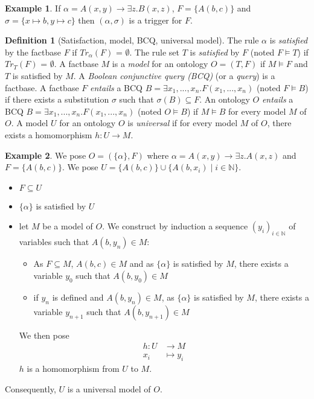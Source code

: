 \documentclass{article}
\theoremstyle{definition}
\newtheorem{definition}{Definition}[section]
\newtheorem{example}{Example}[section]
\theoremstyle{remark}
\def \N {\mathbb N}
\begin{document}
\begin{example}If $\alpha = A(x,y) \rightarrow \exists z.B(x,z)$, $F = \{A(b,c)\}$ and $\sigma = \{x \mapsto b, y \mapsto c \}$ then $(\alpha,\sigma)$ is a trigger for $F$.
\end{example}

\begin{definition}[Satisfaction, model, BCQ, universal model]
The rule $\alpha$ is \emph{satisfied} by the factbase $F$ if $\textit{Tr}_{\alpha}(F)$ = $\emptyset$. The rule set $T$ is \emph{satisfied} by $F$ (noted $F \models T$) if $\textit{Tr}_{T}(F)$ = $\emptyset$. A factbase $M$ is a \emph{model} for an ontology $O = (T,F)$ if $M \models F$ and $T$ is satisfied by $M$. A \emph{Boolean conjunctive query (BCQ)} (or a \emph{query}) is a factbase. A factbase $F$ \emph{entails} a BCQ $B = \exists x_1,...,x_n.F(x_1,...,x_n)$ (noted $F \vDash B$) if there exists a substitution $\sigma$ such that $\sigma(B) \subseteq F$. An ontology $O$ \emph{entails} a BCQ $B = \exists x_1,...,x_n.F(x_1,...,x_n)$ (noted $O \vDash B$) if $M \vDash B$ for every model $M$ of $O$. A model $U$ for an ontology $O$ is \emph{universal} if for
every model $M$ of $O$, there exists a homomorphism $h : U \to M$.
\end{definition}

\begin{example} We pose $O = (\{\alpha\},F)$ where $\alpha = A(x,y) \rightarrow \exists z.A(x,z)$ and $F = \{A(b,c)\}$. We pose $U = \{A(b,c)\}\cup \{A(b,x_i) \mid i \in \N\}$.
\begin{itemize}
\item $F \subseteq U$
\item $\{\alpha\}$ is satisfied by $U$
\item let $M$ be a model of $O$. We construct by induction a sequence $(y_i)_{i \in \N}$ of variables such that $A(b,y_n) \in M$: 
\begin{itemize}
\item As $F \subseteq M$, $A(b,c) \in M$ and as $\{\alpha\}$ is satisfied by $M$, there exists a variable $y_0$ such that $A(b,y_0) \in M$
\item if $y_n$ is defined and $A(b,y_n) \in M$, as $\{\alpha\}$ is satisfied by $M$, there exists a variable $y_{n+1}$ such that $A(b,y_{n+1}) \in M$
\end{itemize}
We then pose 
\begin{align*}
h:U &\to M\\
x_i &\mapsto y_i
\end{align*}
$h$ is a homomorphism from $U$ to $M$.
\end{itemize}
Consequently, $U$ is a universal model of $O$.
\end{example}
\end{document}
